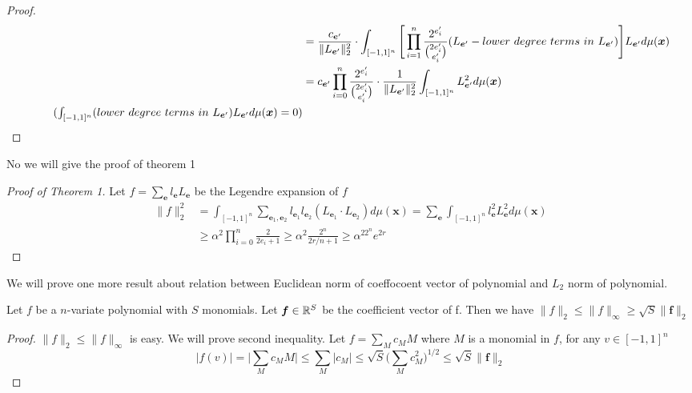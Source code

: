 {\begin{proof}
\begin{align*}
&=\frac{c_{\bm e'}}{\|L_{\bm e'}\|_2^2}\cdot \int_{[-1,1]^n}\Bigg[\prod_{i=1}^n\frac{2^{e'_i}}{{2e'_i \choose e'_i}}(L_{\bm e'} - lower\ degree\ terms\ in\ L_{\bm e'})\Bigg]L_{\bm e'}d\mu(\bm x)\\
&=c_{\bm e'}\prod_{i=0}^{n}\frac{2^{e'_i}}{{2e'_i \choose e'_i}}\cdot \frac{1}{\|L_{\bm e'}\|_2^2}\int_{[-1,1]^n}L_{\bm e'}^2d\mu(\bm x)\\
\tag{$\int_{[-1,1]^n}(lower\ degree\ terms\ in\ L_{\bm e'})L_{\bm e'}d\mu(\bm x)=0$}
\end{align*}
\end{proof}
No we will give the proof of theorem 1
\begin{proof}[Proof of Theorem 1]
Let $f = \sum_{\bm e}l_{\bm e}L_{\bm e}$ be the Legendre expansion of $f$
\begin{align*}
\|f\|_2^2 &=\int_{[-1,1]^n}\sum_{\bm e_1, \bm e_2}l_{\bm e_1}l_{\bm e_2}(L_{\bm e_1}\cdot L_{\bm e_2})d\mu(\bm x)=\sum_{\bm e}\int_{[-1,1]^n}l_{\bm e}^2L_{\bm e}^2d\mu(\bm x)\\
&\ge\alpha^2\prod_{i=0}^n\frac{2}{2e_i+1}\ge\alpha^2\frac{2^n}{2r/n+1}\ge\alpha^22^ne^{2r}
\end{align*}
\end{proof}
We will prove one more result about relation between Euclidean norm of coeffocoent vector of polynomial and $L_2$ norm of polynomial.
\begin{lemma}
Let $f$ be a $n$-variate polynomial with $S$ monomials. Let $\bm f \in \mathbb{R}^S$ be the coefficient vector of f. Then we have $\|f\|_2 \le \|f\|_\infty \ge \sqrt{S}\|\bm f\|_2$
\end{lemma}
\begin{proof}
$\|f\|_2\le \|f\|_\infty$ is easy. We will prove second inequality. Let $f=\sum_{M}c_MM$ where $M$ is a monomial in $f$, for any $v\in [-1,1]^n$
$$
|f(v)|=\Big|\sum_{M}c_MM\Big|\le \sum_{M}|c_M|\le\sqrt{S}\Big(\sum_M c_M^2\Big)^{1/2}\le\sqrt{S} \|\bm f\|_2
$$
\end{proof}
}